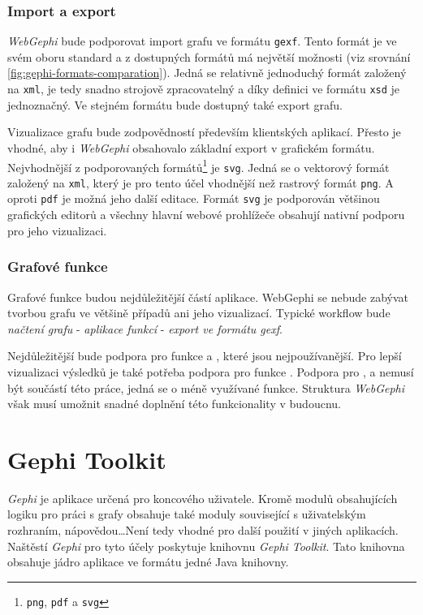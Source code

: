 \documentclass[thesis=M,czech]{FITthesis}[2014/05/6]
\begin{document}
\subsubsection{Import a export}
\textit{WebGephi} bude podporovat import grafu ve formátu \texttt{gexf}. Tento formát je ve svém oboru standard a z dostupných formátů
má největší možnosti (viz srovnání \ref{fig:gephi-formats-comparation}). Jedná se relativně jednoduchý formát založený na \texttt{xml}, je 
tedy snadno strojově zpracovatelný a díky definici ve formátu \texttt{xsd} je jednoznačný. Ve stejném formátu bude dostupný také export grafu.

Vizualizace grafu bude zodpovědností především klientských aplikací. Přesto je vhodné, aby i \textit{WebGephi} obsahovalo základní export v grafickém formátu.
Nejvhodnější z podporovaných formátů\footnote{\texttt{png}, \texttt{pdf} a \texttt{svg}} je \texttt{svg}. Jedná se o vektorový formát založený na \texttt{xml}, který je pro tento účel
vhodnější než rastrový formát \texttt{png}. A oproti \texttt{pdf} je možná jeho další editace. Formát \texttt{svg} je podporován většinou grafických editorů a všechny
hlavní webové prohlížeče obsahují nativní podporu pro jeho vizualizaci.

\subsubsection{Grafové funkce}
Grafové funkce budou nejdůležitější částí aplikace. WebGephi se nebude zabývat tvorbou grafu ve většině případů ani jeho vizualizací. Typické workflow 
bude \textit{načtení grafu} - \textit{aplikace funkcí} - \textit{export ve formátu gexf}.

Nejdůležitější bude podpora pro funkce  a , které jsou nejpoužívanější. Pro lepší vizualizaci výsledků
je také potřeba podpora pro funkce . Podpora pro ,  a  nemusí být
součástí této práce, jedná se o méně využívané funkce. Struktura \textit{WebGephi} však musí umožnit snadné doplnění této funkcionality v budoucnu.

\section{Gephi Toolkit}
\textit{Gephi} je aplikace určená pro koncového uživatele. Kromě modulů obsahujících logiku pro práci s grafy obsahuje také moduly související s uživatelským
rozhraním, nápovědou\ldots Není tedy vhodné pro další použití v jiných aplikacích. Naštěstí \textit{Gephi} pro tyto účely poskytuje knihovnu \textit{Gephi Toolkit}.
Tato knihovna obsahuje jádro aplikace ve formátu jedné Java knihovny.
\end{document}
